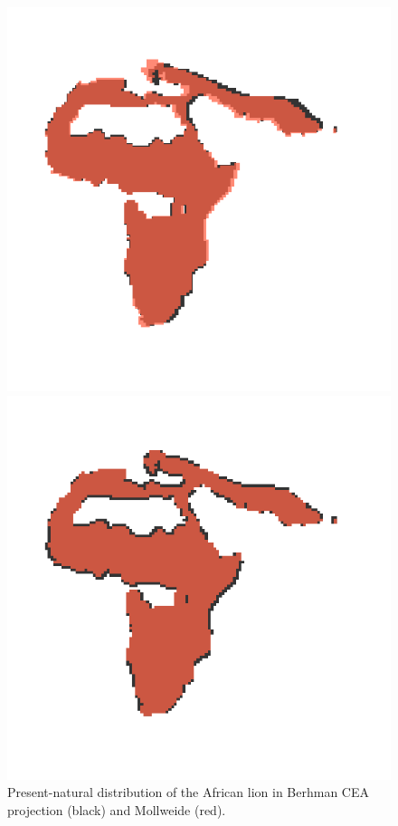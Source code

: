 \documentclass{book}
\begin{document}
\begin{figure}
\begin{minipage}[b]{0.45\linewidth}
\begin{center}
\includegraphics[width=\textwidth]{lion.png}
\caption{Present-natural distribution of the African lion in Berhman CEA projection (black) and Mollweide (red).}
\label{fig:lion1}
\end{center}
\end{minipage}
\hspace{0.5cm}
\begin{minipage}[b]{0.45\linewidth}
\begin{center}
\includegraphics[width=\textwidth]{lion2.png}

\end{center}
\end{minipage}
\end{figure}
\end{document}
